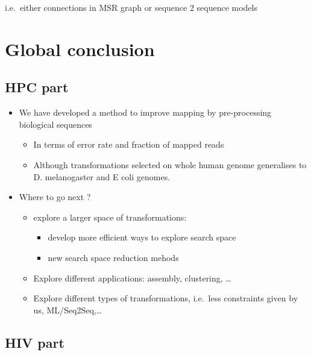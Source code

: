 \documentclass[
  11pt,
  twoside,
  BCOR=10mm,
  listof=totoc]{scrbook}
\begin{document}
i.e.~either connections in MSR graph or sequence 2 sequence models

\printbibliography[segment=\therefsegment,heading=subbibintoc,title={References for chapter \thechapter}]

\hypertarget{global-conclusion}{%
\chapter*{Global conclusion}\label{global-conclusion}}

\hypertarget{hpc-part}{%
\section*{HPC part}\label{hpc-part}}

\begin{itemize}
\item
  We have developed a method to improve mapping by pre-processing biological sequences

  \begin{itemize}
  \item
    In terms of error rate and fraction of mapped reads
  \item
    Although transformations selected on whole human genome generalises to D. melanogaster and E coli genomes.
  \end{itemize}
\item
  Where to go next ?

  \begin{itemize}
  \item
    explore a larger space of transformations:

    \begin{itemize}
    \item
      develop more efficient ways to explore search space
    \item
      new search space reduction mehods
    \end{itemize}
  \item
    Explore different applications: assembly, clustering, \ldots{}
  \item
    Explore different types of transformations, i.e.~less constraints given by us, ML/Seq2Seq,\ldots{}
  \end{itemize}
\end{itemize}

\hypertarget{hiv-part}{%
\section*{HIV part}\label{hiv-part}}
\end{document}
